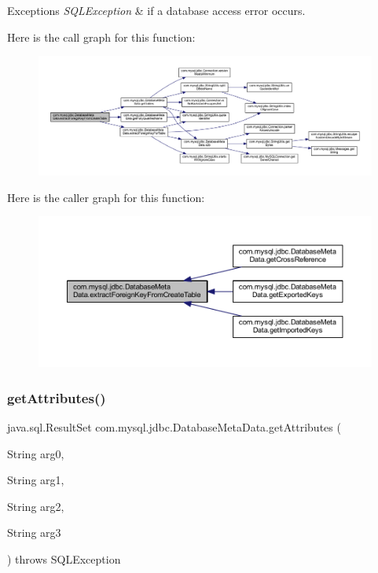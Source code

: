 \begin{DoxyExceptions}{Exceptions}
{\em S\+Q\+L\+Exception} & if a database access error occurs. \\
\hline
\end{DoxyExceptions}
Here is the call graph for this function\+:\nopagebreak
\begin{figure}[H]
\begin{center}
\leavevmode
\includegraphics[width=350pt]{classcom_1_1mysql_1_1jdbc_1_1_database_meta_data_a674d55ea080a7c9051cbb85224526184_cgraph}
\end{center}
\end{figure}
Here is the caller graph for this function\+:\nopagebreak
\begin{figure}[H]
\begin{center}
\leavevmode
\includegraphics[width=350pt]{classcom_1_1mysql_1_1jdbc_1_1_database_meta_data_a674d55ea080a7c9051cbb85224526184_icgraph}
\end{center}
\end{figure}
\mbox{\label{classcom_1_1mysql_1_1jdbc_1_1_database_meta_data_a838b298c0d9bc6061ba699e76100f66d}} 
\subsubsection{\texorpdfstring{get\+Attributes()}{getAttributes()}}
{\footnotesize\ttfamily java.\+sql.\+Result\+Set com.\+mysql.\+jdbc.\+Database\+Meta\+Data.\+get\+Attributes (\begin{DoxyParamCaption}\item[{String}]{arg0,  }\item[{String}]{arg1,  }\item[{String}]{arg2,  }\item[{String}]{arg3 }\end{DoxyParamCaption}) throws S\+Q\+L\+Exception}

